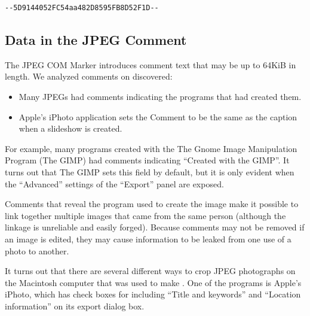 \begin{lstlisting}[caption={A 40-character block of text consisting of
    two dashes, a 128-bit string (32 hexadecimal
    numbers), two more dashes, a carriage return and a line feed were
    found at the end of every photo taken with a Nokia Lumia 822
    cellular phone. Is this a serial number?},label=lumia822]
--5D9144052FC54aa482D8595FB8D52F1D--
\end{lstlisting}

\subsection{Data in the JPEG Comment}

The JPEG COM Marker introduces comment text that may be up to 64KiB in
length. We analyzed comments on discovered:

\begin{itemize}
\item Many JPEGs had comments indicating the programs that had created
  them. 
\item Apple's iPhoto application sets the Comment to be the same as
  the caption when a slideshow is created.
\end{itemize}

For example, many programs created with the The Gnome Image Manipulation
Program (The GIMP) had comments indicating ``Created with the
GIMP''. It turns out that The GIMP sets this field by default, but it
is only evident when the ``Advanced'' settings of the ``Export'' panel
are exposed.

Comments that reveal the program used to create the image make it
possible to link together multiple images that came from the same
person (although the linkage is unreliable and easily forged). Because
comments may not be removed if an image is edited, they may cause
information to be leaked from one use of a photo to another. 


It turns out that there are several different ways to crop JPEG
photographs on the Macintosh computer that was used to make
. One of the programs is Apple's iPhoto, which has
check boxes for including ``Title and keywords'' and ``Location
information'' on its export dialog box. 




